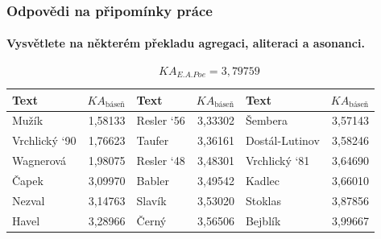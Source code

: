 \documentclass[12pt,xcolor=usenames,dvipsnames]{beamer}
\begin{document}
\begin{frame}
	\frametitle{Odpovědi na připomínky práce}
	\framesubtitle{Vysvětlete na některém překladu agregaci, \textbf{aliteraci} a asonanci.}

	\begin{equation*}
		{K\!A}_{E.A.Poe} = 3{,}79759
	\end{equation*}
{\footnotesize 
	\begin{tabular}{|lr|lr|lr|}
\hline \bfseries Text & \bfseries $KA_{\text{báseň}}$ & \bfseries Text & \bfseries $KA_{\text{báseň}}$ & \bfseries Text & \bfseries $KA_{\text{báseň}}$ \\ 
\hline Mužík          & 1,58133                       & Resler ‘56     & 3,33302                       & Šembera        & 3,57143 \\ 
\hline Vrchlický ‘90  & 1,76623                       & Taufer         & 3,36161                       & Dostál-Lutinov & 3,58246 \\ 
\hline Wagnerová      & 1,98075                       & Resler ‘48     & 3,48301                       & Vrchlický ‘81  & 3,64690 \\ 
\hline Čapek          & 3,09970                       & Babler         & 3,49542                       & Kadlec         & 3,66010 \\ 
\hline Nezval         & 3,14763                       & Slavík         & 3,53020                       & Stoklas        & 3,87856 \\ 
\hline Havel          & 3,28966                       & Černý          & 3,56506                       & Bejblík        & 3,99667 \\ 
\hline 
\end{tabular} 
}

\end{frame}


\end{document}
